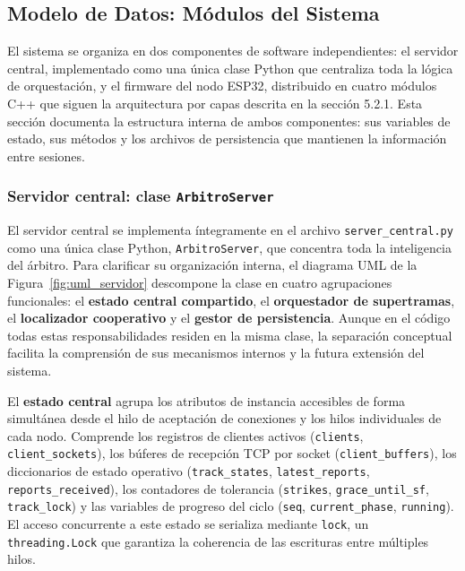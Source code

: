 
\subsection{Modelo de Datos: Módulos del Sistema}

El sistema se organiza en dos componentes de software independientes: el servidor central, implementado como una única clase Python que centraliza toda la lógica de orquestación, y el firmware del nodo ESP32, distribuido en cuatro módulos C++ que siguen la arquitectura por capas descrita en la sección 5.2.1. Esta sección documenta la estructura interna de ambos componentes: sus variables de estado, sus métodos y los archivos de persistencia que mantienen la información entre sesiones.

\subsubsection*{Servidor central: clase \texttt{ArbitroServer}}

El servidor central se implementa íntegramente en el archivo \texttt{server\_central.py} como una única clase Python, \texttt{ArbitroServer}, que concentra toda la inteligencia del árbitro. Para clarificar su organización interna, el diagrama UML de la Figura~\ref{fig:uml_servidor} descompone la clase en cuatro agrupaciones funcionales: el \textbf{estado central compartido}, el \textbf{orquestador de supertramas}, el \textbf{localizador cooperativo} y el \textbf{gestor de persistencia}. Aunque en el código todas estas responsabilidades residen en la misma clase, la separación conceptual facilita la comprensión de sus mecanismos internos y la futura extensión del sistema.

El \textbf{estado central} agrupa los atributos de instancia accesibles de forma simultánea desde el hilo de aceptación de conexiones y los hilos individuales de cada nodo. Comprende los registros de clientes activos (\texttt{clients}, \texttt{client\_sockets}), los búferes de recepción TCP por socket (\texttt{client\_buffers}), los diccionarios de estado operativo (\texttt{track\_states}, \texttt{latest\_reports}, \texttt{reports\_received}), los contadores de tolerancia (\texttt{strikes}, \texttt{grace\_until\_sf}, \texttt{track\_lock}) y las variables de progreso del ciclo (\texttt{seq}, \texttt{current\_phase}, \texttt{running}). El acceso concurrente a este estado se serializa mediante \texttt{lock}, un \texttt{threading.Lock} que garantiza la coherencia de las escrituras entre múltiples hilos.

